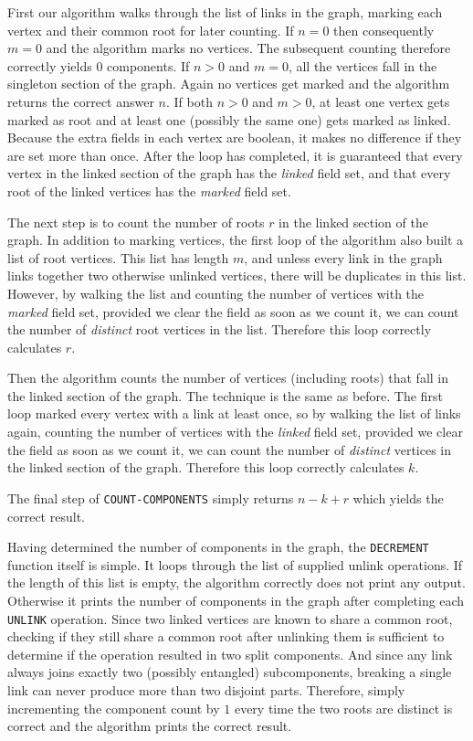 \documentclass[paper=a4, fleqn]{article}
\begin{document}
First our algorithm walks through the list of links in the graph, marking each
vertex and their common root for later counting. If $n=0$ then consequently
$m=0$ and the algorithm marks no vertices. The subsequent counting therefore
correctly yields $0$ components. If $n>0$ and $m=0$, all the vertices fall in
the singleton section of the graph. Again no vertices get marked and the
algorithm returns the correct answer $n$. If both $n>0$ and $m>0$, at least one
vertex gets marked as root and at least one (possibly the same one) gets marked
as linked. Because the extra fields in each vertex are boolean, it makes no
difference if they are set more than once. After the loop has completed, it is
guaranteed that every vertex in the linked section of the graph has the {\em
  linked} field set, and that every root of the linked vertices has the {\em
  marked} field set.

The next step is to count the number of roots $r$ in the linked section of the
graph. In addition to marking vertices, the first loop of the algorithm also
built a list of root vertices. This list has length $m$, and unless every link
in the graph links together two otherwise unlinked vertices, there will be
duplicates in this list. However, by walking the list and counting the number of
vertices with the {\em marked} field set, provided we clear the field as soon as
we count it, we can count the number of {\em distinct} root vertices in the
list. Therefore this loop correctly calculates $r$.

Then the algorithm counts the number of vertices (including roots) that fall in
the linked section of the graph. The technique is the same as before. The first
loop marked every vertex with a link at least once, so by walking the list of
links again, counting the number of vertices with the {\em linked} field set,
provided we clear the field as soon as we count it, we can count the number of
{\em distinct} vertices in the linked section of the graph. Therefore this loop
correctly calculates $k$.

The final step of {\tt COUNT-COMPONENTS} simply returns $n-k+r$ which yields the
correct result.

Having determined the number of components in the graph, the {\tt DECREMENT}
function itself is simple. It loops through the list of supplied unlink
operations. If the length of this list is empty, the algorithm correctly does
not print any output. Otherwise it prints the number of components in the graph
after completing each {\tt UNLINK} operation. Since two linked vertices are
known to share a common root, checking if they still share a common root after
unlinking them is sufficient to determine if the operation resulted in two split
components. And since any link always joins exactly two (possibly entangled)
subcomponents, breaking a single link can never produce more than two disjoint
parts. Therefore, simply incrementing the component count by $1$ every time the
two roots are distinct is correct and the algorithm prints the correct result.
\end{document}
